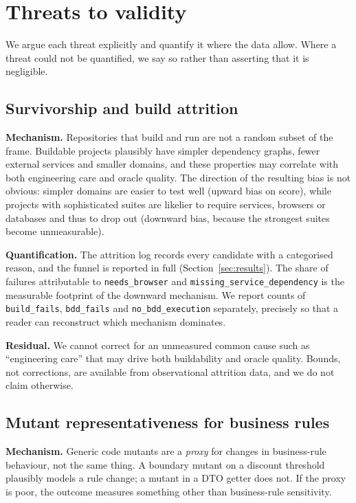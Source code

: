 \section{Threats to validity}
\label{sec:threats}

We argue each threat explicitly and quantify it where the data allow. Where a threat could not be
quantified, we say so rather than asserting that it is negligible.

\subsection{Survivorship and build attrition}

\textbf{Mechanism.} Repositories that build and run are not a random subset of the frame. Buildable
projects plausibly have simpler dependency graphs, fewer external services and smaller domains, and
these properties may correlate with both engineering care and oracle quality. The direction of the
resulting bias is not obvious: simpler domains are easier to test well (upward bias on score), while
projects with sophisticated suites are likelier to require services, browsers or databases and thus to
drop out (downward bias, because the strongest suites become unmeasurable).

\textbf{Quantification.} The attrition log records every candidate with a categorised reason, and the
funnel is reported in full (Section~\ref{sec:results}). The share of failures attributable to
\texttt{needs\_browser} and \texttt{missing\_service\_dependency} is the measurable footprint of the
downward mechanism. We report counts of \texttt{build\_fails}, \texttt{bdd\_fails} and
\texttt{no\_bdd\_execution} separately, precisely so that a reader can reconstruct which mechanism
dominates.

\textbf{Residual.} We cannot correct for an unmeasured common cause such as ``engineering care'' that
may drive both buildability and oracle quality. Bounds, not corrections, are available from
observational attrition data, and we do not claim otherwise.

\subsection{Mutant representativeness for business rules}

\textbf{Mechanism.} Generic code mutants are a \emph{proxy} for changes in business-rule behaviour, not
the same thing. A boundary mutant on a discount threshold plausibly models a rule change; a mutant in
a DTO getter does not. If the proxy is poor, the outcome measures something other than business-rule
sensitivity.

